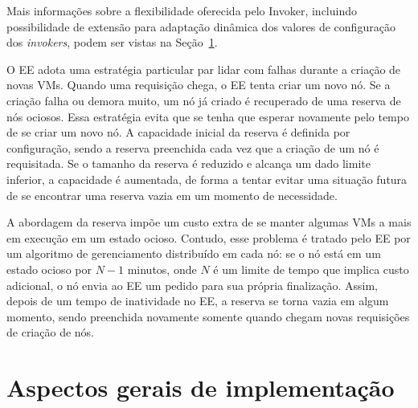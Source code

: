 Mais informações sobre a flexibilidade oferecida pelo
\textsf{Invoker}, incluindo possibilidade de extensão para adaptação dinâmica
dos valores de configuração dos \emph{invokers},
podem ser vistas na Seção~\ref{sec:implementacao}.

O EE adota uma estratégia particular par lidar com falhas durante a criação de novas VMs.
Quando uma requisição chega, o EE tenta criar um novo nó.
Se a criação falha ou demora muito, um nó já criado é recuperado de uma reserva de nós ociosos.
Essa estratégia evita que se tenha que esperar novamente pelo tempo de se criar um novo nó.
A capacidade inicial da reserva é definida por configuração,
sendo a reserva preenchida cada vez que a criação de um nó é requisitada.
Se o tamanho da reserva é reduzido e alcança um dado limite inferior,
a capacidade é aumentada, de forma a tentar evitar uma situação futura
de se encontrar uma reserva vazia em um momento de necessidade.

A abordagem da reserva impõe um custo extra de se manter algumas VMs a mais
em execução em um estado ocioso. Contudo, esse problema é tratado
pelo EE por um algoritmo de gerenciamento distribuído em cada nó:
se o nó está em um estado ocioso por $N-1$ minutos, onde $N$ é um limite
de tempo que implica custo adicional, o nó envia ao EE um pedido para 
sua própria finalização. Assim, depois de um tempo de inatividade no EE,
a reserva se torna vazia em algum momento, sendo preenchida novamente
somente quando chegam novas requisições de criação de nós.



\section{Aspectos gerais de implementação}
\label{sec:implementacao}

